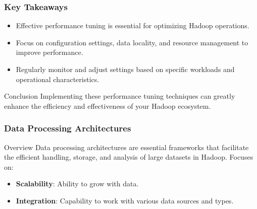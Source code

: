 \documentclass[aspectratio=169]{beamer}
\begin{document}
\begin{frame}[fragile]
    \frametitle{Key Takeaways}
    \begin{itemize}
        \item Effective performance tuning is essential for optimizing Hadoop operations.
        \item Focus on configuration settings, data locality, and resource management to improve performance.
        \item Regularly monitor and adjust settings based on specific workloads and operational characteristics.
    \end{itemize}
    \begin{block}{Conclusion}
        Implementing these performance tuning techniques can greatly enhance the efficiency and effectiveness of your Hadoop ecosystem.
    \end{block}
\end{frame}

\begin{frame}[fragile]
    \frametitle{Data Processing Architectures}
    \begin{block}{Overview}
        Data processing architectures are essential frameworks that facilitate the efficient handling, storage, and analysis of large datasets in Hadoop. 
        Focuses on:
        \begin{itemize}
            \item \textbf{Scalability}: Ability to grow with data.
            \item \textbf{Integration}: Capability to work with various data sources and types.
        \end{itemize}
    \end{block}
\end{frame}
\end{document}

